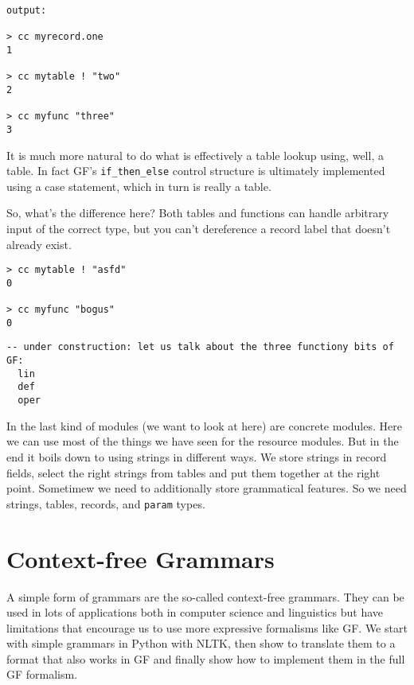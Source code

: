 \documentclass{scrartcl}
\begin{document}
\begin{verbatim}
output:

> cc myrecord.one
1

> cc mytable ! "two"
2

> cc myfunc "three"
3
\end{verbatim}

It is much more natural to do what is effectively a table lookup using, well, a table. In fact GF's \texttt{if\_then\_else} control structure is ultimately implemented using a case statement, which in turn is really a table.

So, what's the difference here? Both tables and functions can handle arbitrary input of the correct type, but you can't dereference a record label that doesn't already exist.

\begin{verbatim}
> cc mytable ! "asfd"
0

> cc myfunc "bogus"
0
\end{verbatim}


\begin{verbatim}
-- under construction: let us talk about the three functiony bits of GF:
  lin
  def
  oper
\end{verbatim}

In the last kind of modules (we want to look at here) are concrete modules. Here we can use most of the things we have seen for the resource modules. But in the end it boils down to using strings in different ways. We store strings in record fields, select the right strings from tables and put them together at the right point. Sometimew we need to additionally store grammatical features. So we need strings, tables, records, and \texttt{param} types.



\section{Context-free Grammars}

A simple form of grammars are the so-called context-free grammars. They can be used in lots of applications both in computer science and linguistics but have limitations that encourage us to use more expressive formalisms like GF. We start with simple grammars in Python with NLTK, then show to translate them to a format that also works in GF and finally show how to implement them in the full GF formalism.
\end{document}
